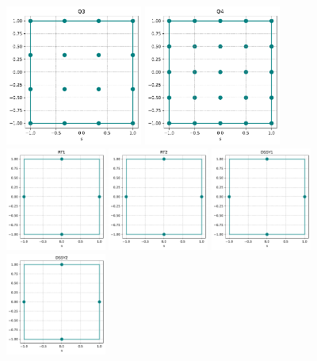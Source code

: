 \begin{center}
\includegraphics[width=4.5cm]{python_codes/fieldstone_120/spaces/Q3_nodes}
\includegraphics[width=4.5cm]{python_codes/fieldstone_120/spaces/Q4_nodes}\\
\includegraphics[width=3.3cm]{python_codes/fieldstone_120/spaces/RT1_nodes}
\includegraphics[width=3.3cm]{python_codes/fieldstone_120/spaces/RT2_nodes}
\includegraphics[width=3.3cm]{python_codes/fieldstone_120/spaces/DSSY1_nodes}
\includegraphics[width=3.3cm]{python_codes/fieldstone_120/spaces/DSSY2_nodes}\\

\end{center}
